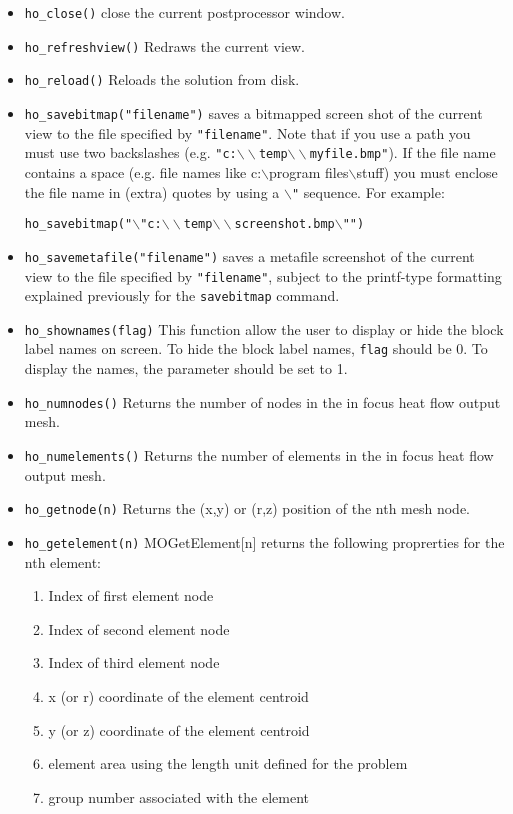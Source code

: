 \begin{itemize}

\item \texttt{ho\_close()} close the current postprocessor window.

\item{\tt ho\_refreshview()} Redraws the current view.

\item{\tt ho\_reload()} Reloads the solution from disk.

\item \texttt{ho\_savebitmap("filename")} saves a bitmapped screen shot of the current
view to the file specified by \texttt{"filename"}. Note that if you
use a path you must use two backslashes (e.g.
\texttt{"c:$\backslash \backslash $temp$\backslash \backslash
$myfile.bmp"}). If the file name contains a space (e.g. file
names like c:$\backslash $program files$\backslash $stuff) you must
enclose the file name in (extra) quotes by using a
\texttt{$\backslash $"} sequence. For example:

\texttt{ho\_savebitmap("$\backslash $"c:$\backslash \backslash
$temp$\backslash \backslash $screenshot.bmp$\backslash $"")}

\item \texttt{ho\_savemetafile("filename")} saves a metafile screenshot of the current
view to the file specified by \texttt{"filename"}, subject to the
printf-type formatting explained previously for the
\texttt{savebitmap} command.

\item \texttt{ho\_shownames(flag)} This function allow the user to display or hide the
block label names on screen. To hide the block label names,
\texttt{flag} should be 0. To display the names, the parameter
should be set to 1.


\item{\tt ho\_numnodes()} Returns the number of nodes in the in focus heat flow output mesh.
\item{\tt ho\_numelements()} Returns the number of elements in the in focus heat flow output mesh.
\item{\tt ho\_getnode(n)} Returns the (x,y) or (r,z) position of the nth mesh node.
\item{\tt ho\_getelement(n)} MOGetElement[n] returns the following proprerties for the nth element:
    \begin{enumerate}
        \item Index of first element node
        \item Index of second element node
        \item Index of third element node
        \item x (or r) coordinate of the element centroid
        \item y (or z) coordinate of the element centroid
        \item element area using the length unit defined for the problem
        \item group number associated with the element
    \end{enumerate}

\end{itemize}
